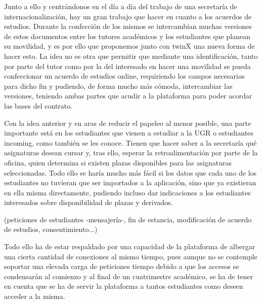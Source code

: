\documentclass[12pt]{article}
\begin{document}
Junto a ello y centrándonos en el día a día del trabajo de una secretaría de internacionalización, hay un gran trabajo que hacer en cuanto a los acuerdos de estudios. Durante la confección de los mismos se intercambian muchas versiones de estos documentos entre los tutores académicos y  los estudiantes que planean su movilidad, y es por ello que proponemos junto con twinX una nueva forma de hacer esto. La idea no es otra que permitir que mediante una identificación, tanto por parte del tutor como por la del interesado en hacer una movilidad se pueda confeccionar un acuerdo de estudios online, requiriendo los campos necesarios para dicho fin y pudiendo, de forma mucho más cómoda, intercambiar las versiones, teniendo ambas partes que acudir a la plataforma para poder acordar las bases del contrato.

Con la idea anterior y en aras de reducir el papeleo al menor posible, una parte importante está en los estudiantes que vienen a estudiar a la UGR o estudiantes incoming, como también se les conoce. Tienen que hacer saber a la secretaría qué asignaturas desean cursar y, tras ello, esperar la retroalimentación por parte de la oficina, quien determina si existen plazas disponibles para las asignaturas seleccionadas. Todo ello se haría mucho más fácil si los datos que cada uno de los estudiantes no tuvieran que ser importados a la aplicación, sino que ya existieran en ella misma directamente, pudiendo incluso dar indicaciones a los estudiantes interesados sobre disponibilidad de plazas y derivados.

(peticiones de estudiantes -mensajería-, fin de estancia, modificación de acuerdo de estudios, consentimiento...)

Todo ello ha de estar respaldado por una capacidad de la plataforma de albergar una cierta cantidad de conexiones al mismo tiempo, pues aunque no se contemple soportar una elevada carga de peticiones tiempo debido a que los accesos se condensarán al comienzo y al final de un cuatrimestre académico, se ha de tener en cuenta que se ha de servir la plataforma a tantos estudiantes como deseen acceder a la misma.


\newpage

\printglossaries

\newpage

\begin{appendices}

\end{appendices}
\end{document}
